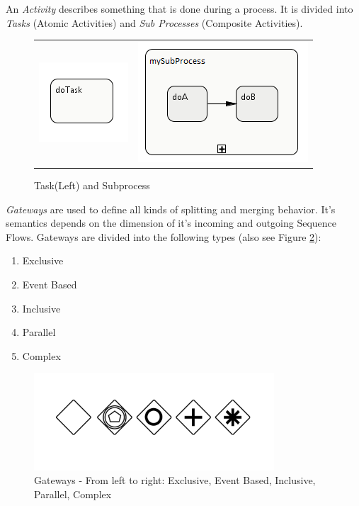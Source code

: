  
An \textit{Activity} describes something that is done during a process. It is divided into \textit{Tasks} (Atomic Activities) and \textit{Sub Processes} (Composite Activities).\\
\begin{figure}[h]
\centering
\begin{tabular}{cc}
\includegraphics{images/mapping/task.png} & \includegraphics{images/mapping/subprocess.png}
\end{tabular}
\caption{Task(Left) and Subprocess}%
\label{fig:task+subprocess}%
\end{figure}

\newpage
\textit{Gateways} are used to define all kinds of splitting and merging behavior. It's semantics depends on the dimension of it's incoming and outgoing Sequence Flows. Gateways are divided into the following types (also see Figure \ref{fig:gateways}):\\
\begin{enumerate}
	\item Exclusive
	\item Event Based
	\item Inclusive
	\item Parallel
	\item Complex
\end{enumerate}



\begin{figure}[htbp]
	\centering
		\includegraphics[width=0.8\textwidth]{images/gateways.png}
	\caption{Gateways - From left to right: Exclusive, Event Based, Inclusive, Parallel, Complex}
	\label{fig:gateways}
\end{figure}



